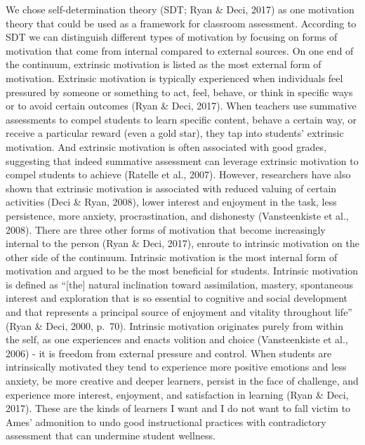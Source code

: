 \documentclass[
]{book}
\begin{document}
We chose self-determination theory (SDT; Ryan \& Deci, 2017) as one motivation theory that could be used as a framework for classroom assessment. According to SDT we can distinguish different types of motivation by focusing on forms of motivation that come from internal compared to external sources. On one end of the continuum, extrinsic motivation is listed as the most external form of motivation. Extrinsic motivation is typically experienced when individuals feel pressured by someone or something to act, feel, behave, or think in specific ways or to avoid certain outcomes (Ryan \& Deci, 2017). When teachers use summative assessments to compel students to learn specific content, behave a certain way, or receive a particular reward (even a gold star), they tap into students' extrinsic motivation. And extrinsic motivation is often associated with good grades, suggesting that indeed summative assessment can leverage extrinsic motivation to compel students to achieve (Ratelle et al., 2007). However, researchers have also shown that extrinsic motivation is associated with reduced valuing of certain activities (Deci \& Ryan, 2008), lower interest and enjoyment in the task, less persistence, more anxiety, procrastination, and dishonesty (Vansteenkiste et al., 2008).
There are three other forms of motivation that become increasingly internal to the person (Ryan \& Deci, 2017), enroute to intrinsic motivation on the other side of the continuum. Intrinsic motivation is the most internal form of motivation and argued to be the most beneficial for students. Intrinsic motivation is defined as ``{[}the{]} natural inclination toward assimilation, mastery, spontaneous interest and exploration that is so essential to cognitive and social development and that represents a principal source of enjoyment and vitality throughout life'' (Ryan \& Deci, 2000, p.~70). Intrinsic motivation originates purely from within the self, as one experiences and enacts volition and choice (Vansteenkiste et al., 2006) - it is freedom from external pressure and control. When students are intrinsically motivated they tend to experience more positive emotions and less anxiety, be more creative and deeper learners, persist in the face of challenge, and experience more interest, enjoyment, and satisfaction in learning (Ryan \& Deci, 2017). These are the kinds of learners I want and I do not want to fall victim to Ames' admonition to undo good instructional practices with contradictory assessment that can undermine student wellness.
\end{document}
